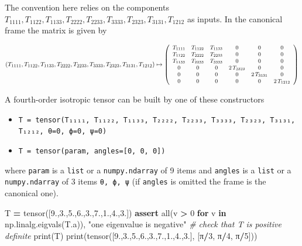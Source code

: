\documentclass[
  a4paper,
  numbers=noendperiod,
  DIV=12]{scrreprt}
\newenvironment{Shaded}{\begin{snugshade}}{\end{snugshade}}
\newcommand{\BuiltInTok}[1]{#1}
\newcommand{\CommentTok}[1]{\textcolor[rgb]{0.56,0.35,0.01}{\textit{#1}}}
\newcommand{\ControlFlowTok}[1]{\textcolor[rgb]{0.13,0.29,0.53}{\textbf{#1}}}
\newcommand{\DecValTok}[1]{\textcolor[rgb]{0.00,0.00,0.81}{#1}}
\newcommand{\FloatTok}[1]{\textcolor[rgb]{0.00,0.00,0.81}{#1}}
\newcommand{\KeywordTok}[1]{\textcolor[rgb]{0.13,0.29,0.53}{\textbf{#1}}}
\newcommand{\NormalTok}[1]{#1}
\newcommand{\OperatorTok}[1]{\textcolor[rgb]{0.81,0.36,0.00}{\textbf{#1}}}
\newcommand{\StringTok}[1]{\textcolor[rgb]{0.31,0.60,0.02}{#1}}
\providecommand{\tightlist}{%
  \setlength{\itemsep}{0pt}\setlength{\parskip}{0pt}}\usepackage{longtable,booktabs,array}
\begin{document}
The convention here relies on the components
\(T_{1 1 1 1}, T_{1 1 2 2}, T_{1 1 3 3}, T_{2 2 2 2}, T_{2 2 3 3}, T_{3 3 3 3}, T_{2 3 2 3}, T_{3 1 3 1}, T_{1 2 1 2}\)
as inputs. In the canonical frame the matrix is given by

\[
\small
(T_{1 1 1 1}, T_{1 1 2 2}, T_{1 1 3 3}, T_{2 2 2 2}, T_{2 2 3 3}, T_{3 3 3 3}, T_{2 3 2 3}, T_{3 1 3 1}, T_{1 2 1 2})
\mapsto
\left(
\begin{array}{cccccc}
T_{1 1 1 1} & T_{1 1 2 2} & T_{1 1 3 3} & 0 & 0 & 0 \\
T_{1 1 2 2} & T_{2 2 2 2} & T_{2 2 3 3} & 0 & 0 & 0 \\
T_{1 1 3 3} & T_{2 2 3 3} & T_{3 3 3 3} & 0 & 0 & 0 \\
0 & 0 & 0 & 2 \, T_{2 3 2 3} & 0 & 0 \\
0 & 0 & 0 & 0 & 2 \, T_{3 1 3 1} & 0 \\
0 & 0 & 0 & 0 & 0 & 2 \, T_{1 2 1 2} \\
\end{array}
\right)
\]

A fourth-order isotropic tensor can be built by one of these
constructors

\begin{itemize}
\tightlist
\item
  \texttt{T\ =\ tensor(T₁₁₁₁,\ T₁₁₂₂,\ T₁₁₃₃,\ T₂₂₂₂,\ T₂₂₃₃,\ T₃₃₃₃,\ T₂₃₂₃,\ T₃₁₃₁,\ T₁₂₁₂,\ θ=0,\ ϕ=0,\ ψ=0)}
\item
  \texttt{T\ =\ tensor(param,\ angles={[}0,\ 0,\ 0{]})}
\end{itemize}

where \texttt{param} is a \texttt{list} or a \texttt{numpy.ndarray} of 9
items and \texttt{angles} is a \texttt{list} or a \texttt{numpy.ndarray}
of 3 items \texttt{θ,\ ϕ,\ ψ} (if \texttt{angles} is omitted the frame
is the canonical one).

\begin{Shaded}
\begin{Highlighting}[]
\NormalTok{T }\OperatorTok{=}\NormalTok{ tensor([}\FloatTok{9.}\NormalTok{,}\FloatTok{3.}\NormalTok{,}\FloatTok{5.}\NormalTok{,}\FloatTok{6.}\NormalTok{,}\FloatTok{3.}\NormalTok{,}\FloatTok{7.}\NormalTok{,}\FloatTok{1.}\NormalTok{,}\FloatTok{4.}\NormalTok{,}\FloatTok{3.}\NormalTok{])}
\ControlFlowTok{assert} \BuiltInTok{all}\NormalTok{(v }\OperatorTok{\textgreater{}} \DecValTok{0} \ControlFlowTok{for}\NormalTok{ v }\KeywordTok{in}\NormalTok{ np.linalg.eigvals(T.a)), }\StringTok{"one eigenvalue is negative"} \CommentTok{\# check that T is positive definite}
\BuiltInTok{print}\NormalTok{(T)}
\BuiltInTok{print}\NormalTok{(tensor([}\FloatTok{9.}\NormalTok{,}\FloatTok{3.}\NormalTok{,}\FloatTok{5.}\NormalTok{,}\FloatTok{6.}\NormalTok{,}\FloatTok{3.}\NormalTok{,}\FloatTok{7.}\NormalTok{,}\FloatTok{1.}\NormalTok{,}\FloatTok{4.}\NormalTok{,}\FloatTok{3.}\NormalTok{], [π}\OperatorTok{/}\DecValTok{3}\NormalTok{, π}\OperatorTok{/}\DecValTok{4}\NormalTok{, π}\OperatorTok{/}\DecValTok{5}\NormalTok{]))}
\end{Highlighting}
\end{Shaded}
\end{document}
